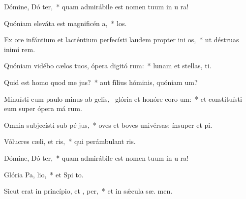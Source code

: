 \item Dómine, Dó ter,~* quam admirábile est nomen tuum in u ra!
\item Quóniam eleváta est magnificén a,~*  los.
\item Ex ore infántium et lacténtium perfecísti laudem propter ini os,~* ut déstruas inimí  rem.
\item Quóniam vidébo cælos tuos, ópera digitó rum:~* lunam et stellas,   ti.
\item Quid est homo quod me  jus?~* aut fílius hóminis, quóniam  um?
\item Minuísti eum paulo minus ab gelis,~\pscross{} glória et honóre coro um:~* et constituísti eum super ópera má rum.
\item Omnia subjecísti sub pé jus,~* oves et boves univérsas: ínsuper et  pi.
\item Vólucres cæli, et  ris,~* qui perámbulant  ris.
\item Dómine, Dó ter,~* quam admirábile est nomen tuum in u ra!
\item Glória Pa,  lio,~* et Spi to.
\item Sicut erat in princípio, et ,  per,~* et in sǽcula sæ. men.
